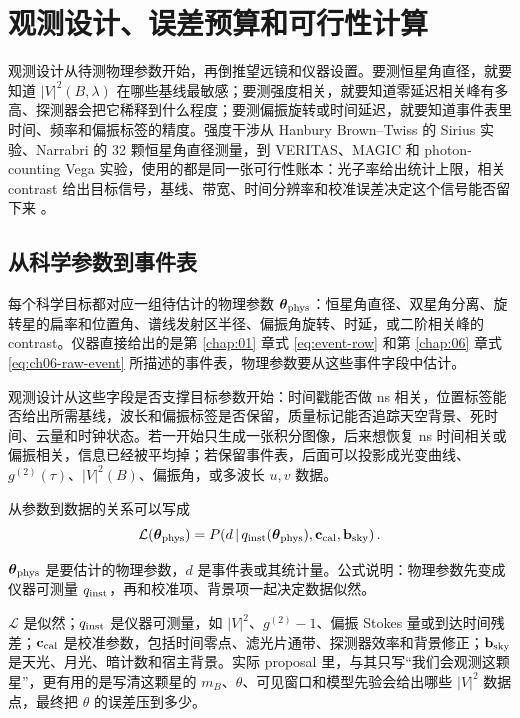 \chapter{观测设计、误差预算和可行性计算}
\label{chap:18}

\begin{chapteropening}
观测设计从待测物理参数开始，再倒推望远镜和仪器设置。要测恒星角直径，就要知道 \(|V|^2(B,\lambda)\) 在哪些基线最敏感；要测强度相关，就要知道零延迟相关峰有多高、探测器会把它稀释到什么程度；要测偏振旋转或时间延迟，就要知道事件表里时间、频率和偏振标签的精度。强度干涉从 Hanbury Brown--Twiss 的 Sirius 实验、Narrabri 的 32 颗恒星角直径测量，到 VERITAS、MAGIC 和 photon-counting Vega 实验，使用的都是同一张可行性账本：光子率给出统计上限，相关 contrast 给出目标信号，基线、带宽、时间分辨率和校准误差决定这个信号能否留下来 \citep{1956Natur.178.1046H,1957RSPSA.242..300B,1958RSPSA.248..222B,1974MNRAS.167..121H,2006ApJ...649..399L,2020NatAs...4.1164A,2020MNRAS.491.1540A,2021MNRAS.506.1585Z}。
\end{chapteropening}

\section{从科学参数到事件表}

每个科学目标都对应一组待估计的物理参数 \(\boldsymbol\theta_{\rm phys}\)：恒星角直径、双星角分离、旋转星的扁率和位置角、谱线发射区半径、偏振角旋转、时延，或二阶相关峰的 contrast。仪器直接给出的是第 \ref{chap:01} 章式 \eqref{eq:event-row} 和第 \ref{chap:06} 章式 \eqref{eq:ch06-raw-event} 所描述的事件表，物理参数要从这些事件字段中估计。

观测设计从这些字段是否支撑目标参数开始：时间戳能否做 ns 相关，位置标签能否给出所需基线，波长和偏振标签是否保留，质量标记能否追踪天空背景、死时间、云量和时钟状态。若一开始只生成一张积分图像，后来想恢复 ns 时间相关或偏振相关，信息已经被平均掉；若保留事件表，后面可以投影成光变曲线、\(g^{(2)}(\tau)\)、\(|V|^2(B)\)、偏振角，或多波长 \(u,v\) 数据。

从参数到数据的关系可以写成
\begin{equation}
  \mathcal L(\boldsymbol\theta_{\rm phys})
  =
  P\!\left(d\,\middle|\,
  q_{\rm inst}(\boldsymbol\theta_{\rm phys}),
  {\bf c}_{\rm cal},
  {\bf b}_{\rm sky}
  \right).
  \label{eq:ch18-likelihood-chain}
\end{equation}
\begin{formulaexplain}[公式 (18.1) 解读]
\(\boldsymbol\theta_{\rm phys}\) 是要估计的物理参数，\(d\) 是事件表或其统计量。公式说明：物理参数先变成仪器可测量 \(q_{\rm inst}\)，再和校准项、背景项一起决定数据似然。
\end{formulaexplain}
\(\mathcal L\) 是似然；\(q_{\rm inst}\) 是仪器可测量，如 \(|V|^2\)、\(g^{(2)}-1\)、偏振 Stokes 量或到达时间残差；\({\bf c}_{\rm cal}\) 是校准参数，包括时间零点、滤光片通带、探测器效率和背景修正；\({\bf b}_{\rm sky}\) 是天光、月光、暗计数和宿主背景。实际 proposal 里，与其只写“我们会观测这颗星”，更有用的是写清这颗星的 \(m_B\)、\(\theta\)、可见窗口和模型先验会给出哪些 \(|V|^2\) 数据点，最终把 \(\theta\) 的误差压到多少。

